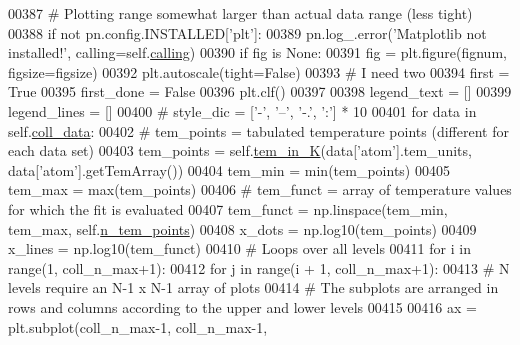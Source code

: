 \begin{DoxyCode}
{{{{{{{00387         \textcolor{comment}{# Plotting range somewhat larger than actual data range (less tight) }
00388         \textcolor{keywordflow}{if} \textcolor{keywordflow}{not} pn.config.INSTALLED[\textcolor{stringliteral}{'plt'}]:
00389             pn.log\_.error(\textcolor{stringliteral}{'Matplotlib not installed!'}, calling=self.\hyperlink{classpyneb_1_1plot_1_1plot_atomic_data_1_1_data_plot_a393a133b607541c57d5ebc5a34687e3f}{calling})
00390         \textcolor{keywordflow}{if} fig \textcolor{keywordflow}{is} \textcolor{keywordtype}{None}:
00391             fig = plt.figure(fignum, figsize=figsize)
00392         plt.autoscale(tight=\textcolor{keyword}{False})
00393         \textcolor{comment}{# I need two }
00394         first = \textcolor{keyword}{True}
00395         first\_done = \textcolor{keyword}{False}
00396         plt.clf()
00397         
00398         legend\_text = []
00399         legend\_lines = []
00400 \textcolor{comment}{#        style\_dic = ['-', '--', '-.', ':'] * 10}
00401         \textcolor{keywordflow}{for} data \textcolor{keywordflow}{in} self.\hyperlink{classpyneb_1_1plot_1_1plot_atomic_data_1_1_data_plot_a50a9af3695633a64c66d082ed67d1bfb}{coll\_data}:
00402             \textcolor{comment}{# tem\_points = tabulated temperature points (different for each data set)}
00403             tem\_points = self.\hyperlink{classpyneb_1_1plot_1_1plot_atomic_data_1_1_data_plot_a13bb54a69f98e9761bacb4b98f481619}{tem\_in\_K}(data[\textcolor{stringliteral}{'atom'}].tem\_units, data[\textcolor{stringliteral}{'atom'}].getTemArray())
00404             tem\_min = min(tem\_points)
00405             tem\_max = max(tem\_points)
00406             \textcolor{comment}{# tem\_funct = array of temperature values for which the fit is evaluated}
00407             tem\_funct = np.linspace(tem\_min, tem\_max, self.\hyperlink{classpyneb_1_1plot_1_1plot_atomic_data_1_1_data_plot_a9f92ae121756c0e3d3624f11e3d2ae17}{n\_tem\_points})
00408             x\_dots = np.log10(tem\_points)
00409             x\_lines = np.log10(tem\_funct)
00410             \textcolor{comment}{# Loops over all levels}
00411             \textcolor{keywordflow}{for} i \textcolor{keywordflow}{in} range(1, coll\_n\_max+1):
00412                 \textcolor{keywordflow}{for} j \textcolor{keywordflow}{in} range(i + 1, coll\_n\_max+1):                
00413                         \textcolor{comment}{# N levels require an N-1 x N-1 array of plots}
00414                         \textcolor{comment}{# The subplots are arranged in rows and columns according to the upper and lower
       levels}
00415  
00416                         ax = plt.subplot(coll\_n\_max-1, coll\_n\_max-1, 
}}}}}}}
\end{DoxyCode}
